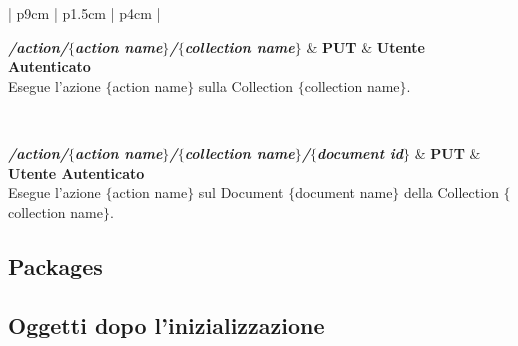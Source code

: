\begin{center}
\begin{longtable}{| p{9cm} | p{1.5cm} | p{4cm} |}
	 {} \\ \hline
	
	\textbf{\emph{/action/$\{$action name$\}$/$\{$collection name$\}$}} & \textbf{PUT} & \textbf{Utente Autenticato} \\ \hline
	 {Esegue l'azione $\{$action name$\}$ sulla Collection $\{$collection name$\}$.}  \\ 
	\specialrule{1pt}{1pt}{1pt}
	
	 {} \\ \hline
	
	\textbf{\emph{/action/$\{$action name$\}$/$\{$collection name$\}$/$\{$document id$\}$}} & \textbf{PUT} & \textbf{Utente Autenticato} \\ \hline
	 {Esegue l'azione $\{$action name$\}$ sul Document $\{$document name$\}$ della Collection 
	$\{$collection name$\}$.}  \\ 
	\specialrule{1pt}{1pt}{1pt}

	
\end{longtable}
	  \egroup
\end{center}

\subsection{Packages}
\subsection{Oggetti dopo l'inizializzazione}

